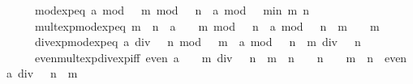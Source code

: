 \begin{isabellebody}
\ \ \ \ \ mod{\isacharunderscore}{\kern0pt}exp{\isacharunderscore}{\kern0pt}eq{\isacharcolon}{\kern0pt}\ {\isacartoucheopen}a\ mod\ {}\ {\isacharcircum}{\kern0pt}\ m\ mod\ {}\ {\isacharcircum}{\kern0pt}\ n\ {\isacharequal}{\kern0pt}\ a\ mod\ {}\ {\isacharcircum}{\kern0pt}\ min\ m\ n{\isacartoucheclose}\isanewline
\ \ \ \ \ mult{\isacharunderscore}{\kern0pt}exp{\isacharunderscore}{\kern0pt}mod{\isacharunderscore}{\kern0pt}exp{\isacharunderscore}{\kern0pt}eq{\isacharcolon}{\kern0pt}\ {\isacartoucheopen}m\ {\isasymle}\ n\ {\isasymLongrightarrow}\ {\isacharparenleft}{\kern0pt}a\ {\isacharasterisk}{\kern0pt}\ {}\ {\isacharcircum}{\kern0pt}\ m{\isacharparenright}{\kern0pt}\ mod\ {\isacharparenleft}{\kern0pt}{}\ {\isacharcircum}{\kern0pt}\ n{\isacharparenright}{\kern0pt}\ {\isacharequal}{\kern0pt}\ {\isacharparenleft}{\kern0pt}a\ mod\ {}\ {\isacharcircum}{\kern0pt}\ {\isacharparenleft}{\kern0pt}n\ {\isacharminus}{\kern0pt}\ m{\isacharparenright}{\kern0pt}{\isacharparenright}{\kern0pt}\ {\isacharasterisk}{\kern0pt}\ {}\ {\isacharcircum}{\kern0pt}\ m{\isacartoucheclose}\isanewline
\ \ \ \ \ div{\isacharunderscore}{\kern0pt}exp{\isacharunderscore}{\kern0pt}mod{\isacharunderscore}{\kern0pt}exp{\isacharunderscore}{\kern0pt}eq{\isacharcolon}{\kern0pt}\ {\isacartoucheopen}a\ div\ {}\ {\isacharcircum}{\kern0pt}\ n\ mod\ {}\ {\isacharcircum}{\kern0pt}\ m\ {\isacharequal}{\kern0pt}\ a\ mod\ {\isacharparenleft}{\kern0pt}{}\ {\isacharcircum}{\kern0pt}\ {\isacharparenleft}{\kern0pt}n\ {\isacharplus}{\kern0pt}\ m{\isacharparenright}{\kern0pt}{\isacharparenright}{\kern0pt}\ div\ {}\ {\isacharcircum}{\kern0pt}\ n{\isacartoucheclose}\isanewline
\ \ \ \ \ even{\isacharunderscore}{\kern0pt}mult{\isacharunderscore}{\kern0pt}exp{\isacharunderscore}{\kern0pt}div{\isacharunderscore}{\kern0pt}exp{\isacharunderscore}{\kern0pt}iff{\isacharcolon}{\kern0pt}\ {\isacartoucheopen}even\ {\isacharparenleft}{\kern0pt}a\ {\isacharasterisk}{\kern0pt}\ {}\ {\isacharcircum}{\kern0pt}\ m\ div\ {}\ {\isacharcircum}{\kern0pt}\ n{\isacharparenright}{\kern0pt}\ {\isasymlongleftrightarrow}\ m\ {\isachargreater}{\kern0pt}\ n\ {\isasymor}\ {}\ {\isacharcircum}{\kern0pt}\ n\ {\isacharequal}{\kern0pt}\ {}\ {\isasymor}\ {\isacharparenleft}{\kern0pt}m\ {\isasymle}\ n\ {\isasymand}\ even\ {\isacharparenleft}{\kern0pt}a\ div\ {}\ {\isacharcircum}{\kern0pt}\ {\isacharparenleft}{\kern0pt}n\ {\isacharminus}{\kern0pt}\ m{\isacharparenright}{\kern0pt}{\isacharparenright}{\kern0pt}{\isacharparenright}{\kern0pt}{\isacartoucheclose}\isanewline

\end{isabellebody}
